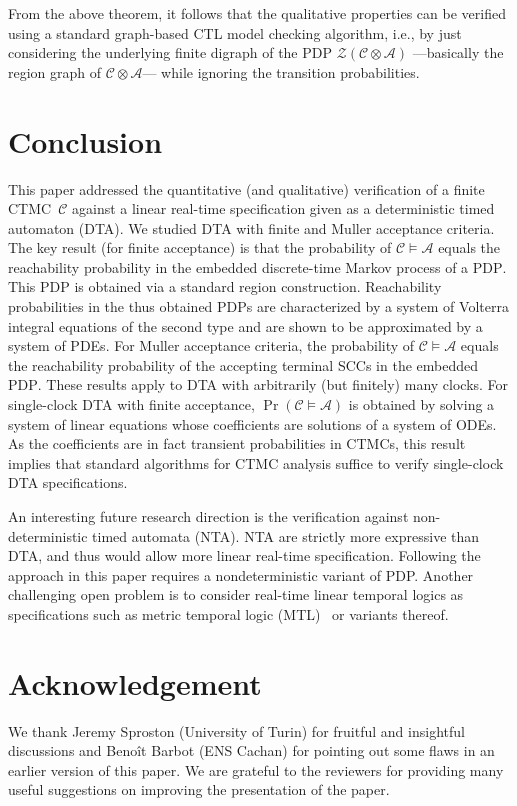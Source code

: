 \documentclass{LMCS}
\newcommand{\mc}[1]{\mathcal{#1}}
\newcommand{\<}{\langle}
\renewcommand{\>}{\rangle}
\newcommand{\mC}{\mathcal{C}}
\newcommand{\mA}{\mathcal{A}}
\newcommand{\CTMC}{\textsc{{CTMC}}}
\newcommand{\PDP}{\textsc{PDP}}
\begin{document}
From the above theorem, it follows that the qualitative properties can be verified using a
standard graph-based CTL model checking algorithm, i.e., by just considering the
underlying finite digraph of the PDP $\mc{Z}(\mc{C} \otimes \mc{A})$ ---basically the
region graph of $\mC\otimes\mA$--- while ignoring the transition probabilities.



\section{Conclusion}\label{sec:concl}
This paper addressed the quantitative (and qualitative) verification of a finite \CTMC\
$\mC$ against a linear real-time specification given as a deterministic timed automaton
(DTA).
We studied DTA with finite and Muller acceptance criteria.
The key result (for finite acceptance) is that the probability of $\mC \models \mA$ equals
the reachability probability in the embedded discrete-time Markov process of a \PDP.
This PDP is obtained via a standard region construction.
Reachability probabilities in the thus obtained PDPs are characterized by a system of
Volterra integral equations of the second type and are shown to be approximated by a
system of  PDEs.
For Muller acceptance criteria, the probability of $\mC \models \mA$ equals the reachability
probability of the accepting terminal SCCs in the embedded \PDP.
These results apply to DTA with arbitrarily (but finitely) many clocks.
For single-clock DTA with finite acceptance, $\Pr(\mC\models \mA)$ is obtained by
solving a system of linear equations whose coefficients are solutions of a system of ODEs.
As the coefficients are in fact transient probabilities in CTMCs, this result implies that
standard algorithms for CTMC analysis suffice to verify single-clock DTA specifications.

An interesting future research direction is the verification against non-deterministic timed
automata (NTA).
NTA are strictly more expressive than DTA, and thus would allow more linear real-time
specification.
Following the approach in this paper requires a nondeterministic variant of PDP.
Another challenging open problem is to consider real-time linear temporal logics as
specifications such as metric temporal logic (MTL)~\cite{Koy90} or variants thereof.

\section*{Acknowledgement}
\begin{small}
We thank Jeremy Sproston (University of Turin) for fruitful and insightful discussions and
Beno\^it Barbot (ENS Cachan) for pointing out some flaws in an earlier version of this
paper.
We are grateful to the reviewers for providing many useful suggestions on improving the
presentation of the paper.
\end{small}



\end{document}
